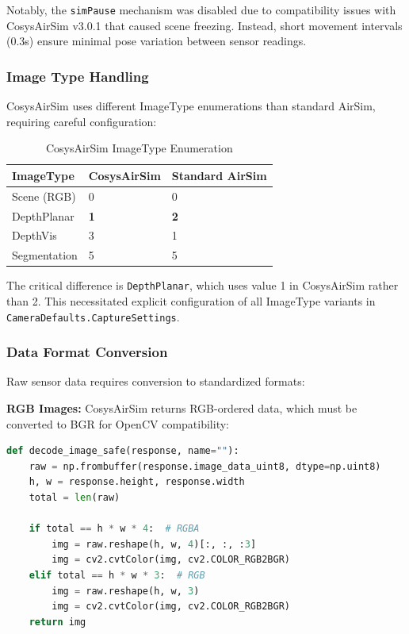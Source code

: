 Notably, the \texttt{simPause} mechanism was disabled due to compatibility issues with CosysAirSim v3.0.1 that caused scene freezing. Instead, short movement intervals (0.3s) ensure minimal pose variation between sensor readings.

\subsubsection{Image Type Handling}

CosysAirSim uses different ImageType enumerations than standard AirSim, requiring careful configuration:

\begin{table}[htbp]
\centering
\caption{CosysAirSim ImageType Enumeration}
\label{tab:imagetype}
\begin{tabular}{@{}lll@{}}
\toprule
\textbf{ImageType} & \textbf{CosysAirSim} & \textbf{Standard AirSim} \\
\midrule
Scene (RGB) & 0 & 0 \\
DepthPlanar & \textbf{1} & \textbf{2} \\
DepthVis & 3 & 1 \\
Segmentation & 5 & 5 \\
\bottomrule
\end{tabular}
\end{table}

The critical difference is \texttt{DepthPlanar}, which uses value 1 in CosysAirSim rather than 2. This necessitated explicit configuration of all ImageType variants in \texttt{CameraDefaults.CaptureSettings}.

\subsubsection{Data Format Conversion}

Raw sensor data requires conversion to standardized formats:

\textbf{RGB Images:} CosysAirSim returns RGB-ordered data, which must be converted to BGR for OpenCV compatibility:

\begin{lstlisting}[language=Python, caption={RGB to BGR Conversion}]
def decode_image_safe(response, name=""):
    raw = np.frombuffer(response.image_data_uint8, dtype=np.uint8)
    h, w = response.height, response.width
    total = len(raw)

    if total == h * w * 4:  # RGBA
        img = raw.reshape(h, w, 4)[:, :, :3]
        img = cv2.cvtColor(img, cv2.COLOR_RGB2BGR)
    elif total == h * w * 3:  # RGB
        img = raw.reshape(h, w, 3)
        img = cv2.cvtColor(img, cv2.COLOR_RGB2BGR)
    return img
\end{lstlisting}

